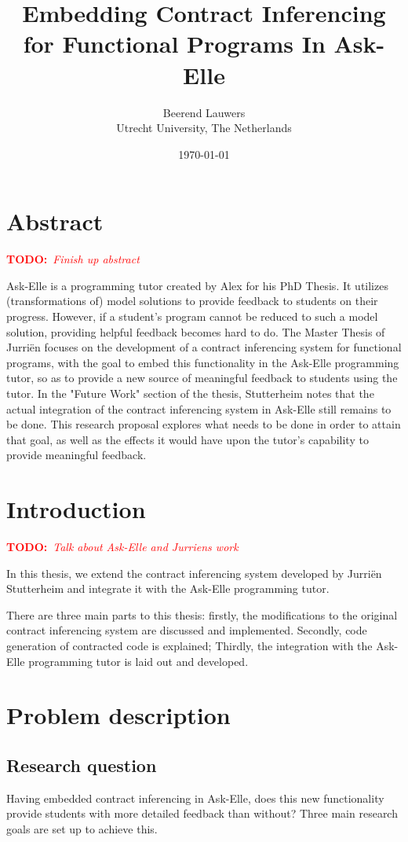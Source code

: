 \documentclass[10pt]{report}
\author{
	Beerend Lauwers\\
	Utrecht University, The Netherlands}
\date{\today}
\title{Embedding Contract Inferencing for Functional Programs In Ask-Elle}
\newcommand{\annotate}[3]{
	\begin{scriptsize}
	\textcolor{#1}{\textbf{#2}~\textit{#3}}
	\end{scriptsize}\newline}
\newcommand{\todo}[1]{\annotate{red} {TODO:} {#1}}
\begin{document}
\maketitle


\chapter{Abstract}
\todo{Finish up abstract}
Ask-Elle is a programming tutor created by Alex \citet{Gerdes:2012:phd} for his PhD Thesis. It utilizes (transformations of) model solutions to provide feedback to students on their progress.
However, if a student's program cannot be reduced to such a model solution, providing helpful feedback becomes hard to do. 
The Master Thesis of Jurri\"en \citet{Stutterheim:2013:thesis} focuses on the development of a contract inferencing system for functional programs, with the goal to embed this functionality in the Ask-Elle programming tutor, so as to provide a new source of meaningful feedback to students using the tutor.
In the "Future Work" section of the thesis, Stutterheim notes that the actual integration of the contract inferencing system in Ask-Elle still remains to be done.
This research proposal explores what needs to be done in order to attain that goal, as well as the effects it would have upon the tutor's capability to provide meaningful feedback.

\tableofcontents

\chapter{Introduction}
\todo{Talk about Ask-Elle and Jurriens work}
In this thesis, we extend the contract inferencing system developed by Jurri\"en Stutterheim and integrate it with the Ask-Elle programming tutor.

There are three main parts to this thesis:
firstly, the modifications to the original contract inferencing system are discussed and implemented. Secondly, code generation of contracted code is explained; Thirdly, the integration with the Ask-Elle programming tutor is laid out and developed.

\chapter{Problem description}
\section{Research question}
Having embedded contract inferencing in Ask-Elle, does this new functionality provide students with more detailed feedback than without?
Three main research goals are set up to achieve this.
\end{document}
